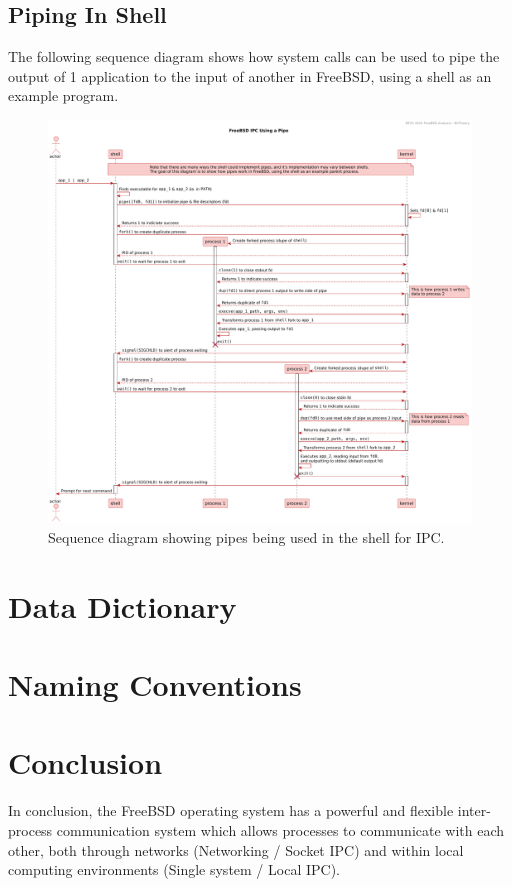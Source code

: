 \documentclass[12pt, dvipsnames, a4paper]{article}
\begin{document}
\subsection{Piping In Shell}
The following sequence diagram shows how system calls can be used to pipe the
output of 1 application to the input of another in FreeBSD, using a shell
as an example program.
\begin{figure}[!htb]
	\advance\leftskip-0.5cm
	\includegraphics[width = 570pt]{assets/use_case_diagrams/pipe.pdf}
	\caption{Sequence diagram showing pipes being used in the shell for IPC. \cite{pipe}\cite{fork}\cite{wait}\cite{close}\cite{dup}\cite{execve}\cite{signal}\cite{pipe-explained}}
\end{figure}

\section{Data Dictionary}
\lipsum[1]

\section{Naming Conventions}
\lipsum[1]

\section{Conclusion}
In conclusion, the FreeBSD operating system has a powerful and flexible inter-process communication system which allows processes to communicate with each other, both through networks (Networking / Socket IPC) and within local computing environments (Single system / Local IPC). 
\end{document}
